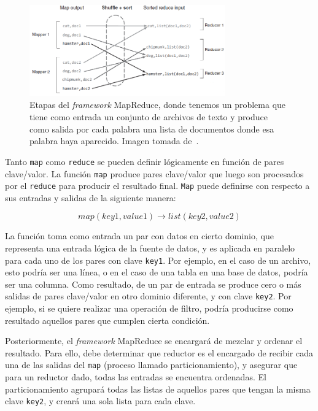 \documentclass[conference]{IEEEtran}
\begin{document}
\begin{figure}[htbp!]
\centering
\includegraphics[width=0.75\textwidth]{images/mapreduce.png}
\caption{Etapas del \textit{framework} MapReduce, donde tenemos un problema que tiene como entrada un conjunto de archivos de texto y produce como salida por cada palabra una lista de documentos donde esa palabra haya aparecido. Imagen tomada de~\cite{Holmes12}.}
\label{mapreduce}
\end{figure}


Tanto \texttt{map} como \texttt{reduce} se pueden definir lógicamente en función de pares clave/valor.
La función \texttt{map} produce pares clave/valor que luego son procesados por el \texttt{reduce} para producir el resultado final.
\texttt{Map} puede definirse con respecto a sus entradas y salidas de la siguiente manera:

\begin{equation*}
map(key1, value1) \rightarrow list(key2, value2)
\end{equation*}


La función toma como entrada un par con datos en cierto dominio, que representa una entrada lógica de la fuente de datos, y es aplicada en paralelo para cada uno de los pares con clave \texttt{key1}.
Por ejemplo, en el caso de un archivo, esto podría ser una línea, o en el caso de una tabla en una base de datos, podría ser una columna. 
Como resultado, de un par de entrada se produce cero o más salidas de pares clave/valor en otro dominio diferente, y con clave \texttt{key2}.
Por ejemplo, si se quiere realizar una operación de filtro, podría producirse como resultado aquellos pares que cumplen cierta condición.


Posteriormente, el \textit{framework} MapReduce se encargará de mezclar y ordenar el resultado.
Para ello, debe determinar que reductor es el encargado de recibir cada una de las salidas del \texttt{map} (proceso llamado particionamiento), y asegurar que para un reductor dado, todas las entradas se encuentra ordenadas.
El particionamiento agrupará todas las listas de aquellos pares que tengan la misma clave \texttt{key2}, y creará una sola lista para cada clave.
\end{document}
